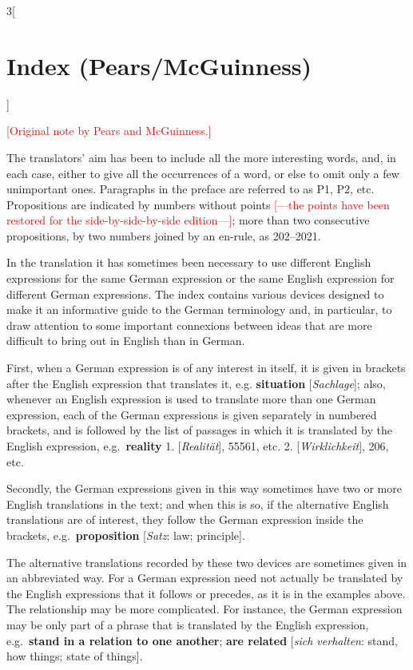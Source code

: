 \documentclass[oneside,openany,12pt]{book}
\newcommand{\kckaddition}[1]{\textcolor{red}{#1}}
\begin{document}
\begin{multicols}{3}[\section*{Index (Pears/McGuinness)}]

\begin{center}
\kckaddition{[Original note by Pears and McGuinness.]}
\end{center}


\noindent The translators' aim has been to include all the more interesting words, and, in each case, either to give all the occurrences of a word, or else to omit only a few unimportant ones. Paragraphs in the preface are referred to as P1, P2, etc. Propositions are indicated by numbers without points \kckaddition{[---the points have been restored for the side-by-side-by-side edition---]}; more than two consecutive propositions, by two numbers joined by an en-rule, as 202--2021.

In the translation it has sometimes been necessary to use different English expressions for the same German expression or the same English expression for different German expressions. The index contains various devices designed to make it an informative guide to the German terminology and, in particular, to draw attention to some important connexions between ideas that are more difficult to bring out in English than in German.

First, when a German expression is of any interest in itself, it is given in brackets after the English expression that translates it, e.g. \textbf{situation} [\textit{Sachlage}]; also, whenever an English expression is used to translate more than one German expression, each of the German expressions is given separately in numbered brackets, and is followed by the list of passages in which it is translated by the English expression, e.g.\ \textbf{reality} 1. [\textit{Realit{\"a}t}], 55561, etc. 2. [\textit{Wirklichkeit}], 206, etc.

Secondly, the German expressions given in this way sometimes have two
or more English translations in the text; and when this is so, if the alternative English translations are of interest, they follow the German expression inside the brackets, e.g.\ \textbf{proposition} [\textit{Satz}: law; principle].

The alternative translations recorded by these two devices are sometimes given in an abbreviated way. For a German expression need not actually be translated by the English expressions that it follows or precedes, as it is in the examples above. The relationship may be more complicated. For instance, the German expression may be only part of a phrase that is translated by the English expression, e.g.\ \textbf{stand in a relation to one another}; \textbf{are related}
[\textit{sich verhalten}: stand, how things; state of things].


\end{multicols}
\end{document}

